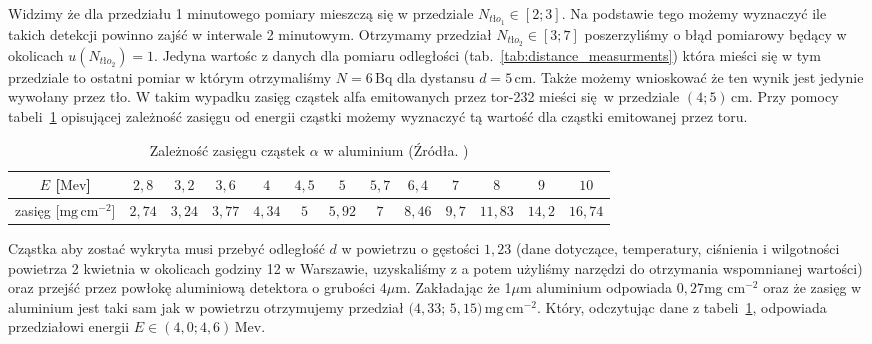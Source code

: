 \documentclass[12pt]{article}
\begin{document}
Widzimy że dla przedziału 1 minutowego pomiary mieszczą się w przedziale \(N_{tło_1} \in [2; 3]\). Na podstawie tego możemy wyznaczyć ile takich detekcji powinno zajść w interwale 2 minutowym.
Otrzymamy przedział \(N_{tło_2} \in [3;7]\) poszerzyliśmy o błąd pomiarowy będący w okolicach \(u(N_{tło_2}) = 1\).
Jedyna wartośc z danych dla pomiaru odległości (tab.~\ref{tab:distance_measurments}) która mieści się w tym przedziale to ostatni pomiar w którym otrzymaliśmy \(N = 6 \, \mathrm{Bq}\) dla dystansu \(d = 5 \, \mathrm{cm}\).
Także możemy wnioskować że ten wynik jest jedynie wywołany przez tło. W takim wypadku zasięg cząstek alfa emitowanych przez tor-232 mieści się w przedziale \((4; 5) \, \mathrm{cm}\). Przy pomocy tabeli~\ref{tab:energy_range} opisującej zależność zasięgu od energii cząstki możemy wyznaczyć tą wartość dla cząstki emitowanej przez toru.
\begin{table}[H]
	\centering
	\begin{tabular}{|c|c|c|c|c|c|c|c|c|c|c|c|c|}
		\midrule
		\(E\) [\(\mathrm{Mev}\)]            & \(2{,}8\)  & \(3{,}2\)  & \(3{,}6\)  & \(4\)      & \(4{,}5\) & \(5\)      & \(5{,}7\) & \(6{,}4\)  & \(7\)     & \(8\)       & \(9\)      & \(10\)      \\
		\midrule
		zasięg [\(\mathrm{mg \, cm}^{-2}\)] & \(2{,}74\) & \(3{,}24\) & \(3{,}77\) & \(4{,}34\) & \(5\)     & \(5{,}92\) & \(7\)     & \(8{,}46\) & \(9{,}7\) & \(11{,}83\) & \(14{,}2\) & \(16{,}74\) \\
		\bottomrule
	\end{tabular}
	\caption{Zależność zasięgu cząstek \(\alpha\) w aluminium (Źródła. \cite{skrypt}\cite{alpha_max_range})}
	\label{tab:energy_range}
\end{table}

Cząstka aby zostać wykryta musi przebyć odległość \(d\) w powietrzu o gęstości \(1{,}23\) (dane dotyczące, temperatury, ciśnienia i wilgotności powietrza 2 kwietnia w okolicach godziny 12 w Warszawie, uzyskaliśmy z \cite{temp} a potem użyliśmy narzędzi \cite{density}\cite{dew} do otrzymania wspomnianej wartości) oraz przejść przez powłokę aluminiową detektora o grubości \(4\mu \)m. Zakładając że 1\(\mu\)m aluminium odpowiada \(0{,}27\)mg cm\(^{-2}\) oraz że zasięg w aluminium jest taki sam jak w powietrzu otrzymujemy przedział \((4{,}33\); \(5{,}15) \, \mathrm{mg \, cm^{-2}}\). Który, odczytując dane z tabeli~\ref{tab:energy_range}, odpowiada przedziałowi energii \(E \in (4{,}0; 4{,}6) \, \mathrm{Mev}\).
\end{document}
